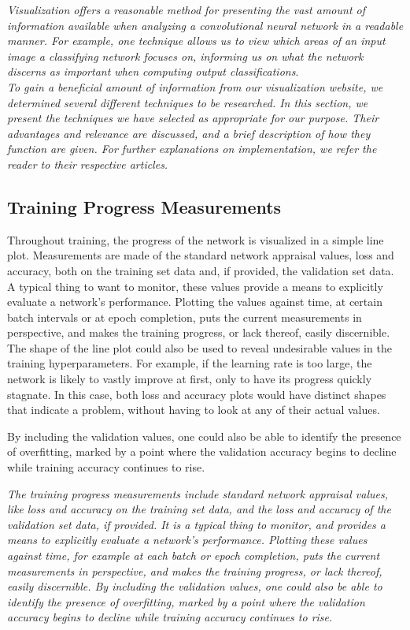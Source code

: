 \textit{Visualization offers a reasonable method for presenting the vast amount of information available when analyzing a convolutional neural network in a readable manner. For example, one technique allows us to view which areas of an input image a classifying network focuses on, informing us on what the network discerns as important when computing output classifications}. \\

\noindent \textit{To gain a beneficial amount of information from our visualization website, we determined several different techniques to be researched. In this section, we present the techniques we have selected as appropriate for our purpose. Their advantages and relevance are discussed, and a brief description of how they function are given. For further explanations on implementation, we refer the reader to their respective articles.} 

\subsection{Training Progress Measurements}

Throughout training, the progress of the network is visualized in a simple line plot. Measurements are made of the standard network appraisal values, loss and accuracy, both on the training set data and, if provided, the validation set data. A typical thing to want to monitor, these values provide a means to explicitly evaluate a network’s performance. Plotting the values against time, at certain batch intervals or at epoch completion, puts the current measurements in perspective, and makes the training progress, or lack thereof, easily discernible. The shape of the line plot could also be used to reveal undesirable values in the training hyperparameters. For example, if the learning rate is too large, the network is likely to vastly improve at first, only to have its progress quickly stagnate. In this case, both loss and accuracy plots would have distinct shapes that indicate a problem, without having to look at any of their actual values.

By including the validation values, one could also be able to identify the presence of overfitting, marked by a point where the validation accuracy begins to decline while training accuracy continues to rise.

\textit{The training progress measurements include standard network appraisal values, like loss and accuracy on the training set data, and the loss and accuracy of the validation set data, if provided. It is a typical thing to monitor, and provides a means to explicitly evaluate a network’s performance. Plotting these values against time, for example at each batch or epoch completion, puts the current measurements in perspective, and makes the training progress, or lack thereof, easily discernible. By including the validation values, one could also be able to identify the presence of overfitting, marked by a point where the validation accuracy begins to decline while training accuracy continues to rise.}

